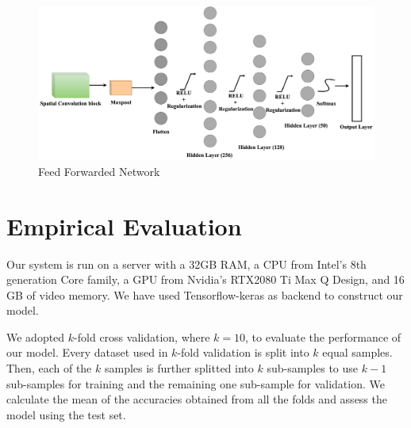 \documentclass[pdflatex,sn-mathphys]{sn-jnl}%
\begin{document}
\begin{figure}[ht]
        \centering
		\hspace*{0.1in}
		\includegraphics[width=1.0\linewidth]{ANN.png}
	    \caption{Feed Forwarded Network}
	    \label{ANN}
		
   \vspace{-4mm}
	\end{figure} 

\section{Empirical Evaluation}
\label{Analysis}
Our system is run on a server with a 32GB RAM, a CPU from Intel's 8th generation Core family, a GPU from Nvidia's RTX2080 Ti Max Q Design, and 16 GB of video memory. We have used Tensorflow-keras as backend to construct our model.

We adopted $k$-fold cross validation, where $k = 10$, to evaluate the performance of our model. Every dataset used in $k$-fold validation is split into $k$ equal samples. Then, each of the $k$ samples is further splitted into $k$ sub-samples to use $k-1$ sub-samples for training and the remaining one sub-sample for validation. We calculate the mean of the accuracies obtained from all the folds and assess the model using the test set.

\end{document}
